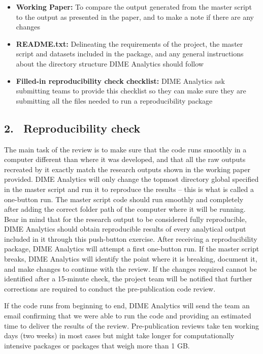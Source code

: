 \begin{fullwidth}
	\bigskip

	\begin{itemize}
		\setlength\itemsep{-0.1em}
		\item \textbf{Working Paper:} To compare the output generated from the master script to the output as presented in the paper, and to make a note if there are any changes
		\item \textbf{README.txt:} Delineating the requirements of the project, the master script and datasets included in the package, and any general instructions about the directory structure DIME Analytics should follow
		\item \textbf{Filled-in reproducibility check checklist:} DIME Analytics ask submitting teams to provide this checklist so they can make sure they are submitting all the files needed to run a reproducibility package
	\end{itemize}

	\subsection{2. \, Reproducibility check}

	The main task of the review is to make sure that the code runs smoothly in a computer different than where it was developed, and that all the raw outputs recreated by it exactly match the research outputs shown in the working paper provided.
DIME Analytics will only change the topmost directory global specified in the master script and run it to reproduce the results – this is what is called a one-button run. The master script code should run smoothly and completely after adding the correct folder path of the computer where it will be running. Bear in mind that for the research output to be considered fully reproducible, DIME Analytics should obtain reproducible results of every analytical output included in it through this push-button exercise.
After receiving a reproducibility package, DIME Analytics will attempt a first one-button run. If the master script breaks, DIME Analytics will identify the point where it is breaking, document it, and make changes to continue with the review. If the changes required cannot be identified after a 15-minute check, the project team will be notified that further corrections are required to conduct the pre-publication code review.

	\bigskip

	If the code runs from beginning to end, DIME Analytics will send the team an email confirming that we were able to run the code and providing an estimated time to deliver the results of the review. Pre-publication reviews take ten working days (two weeks) in most cases but might take longer for computationally intensive packages or packages that weigh more than 1 GB.


\end{fullwidth}
